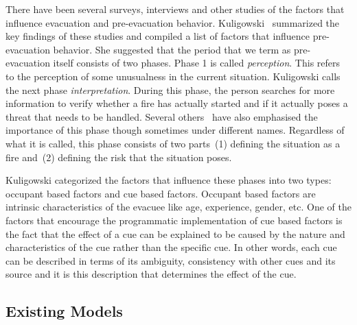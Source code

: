 There have been several surveys, interviews and other studies of the factors that influence evacuation and pre-evacuation behavior. Kuligowski~\cite{Kuligowski:2009un} summarized the key findings of these studies and compiled a list of factors that influence pre-evacuation behavior. She suggested that the period that we term as pre-evacuation itself consists of two phases. Phase 1 is called \emph{perception}. This refers to the perception of some unusualness in the current situation. Kuligowski calls the next phase \emph{interpretation}. During this phase, the person searches for more information to verify whether a fire has actually started and if it actually poses a threat that needs to be handled. Several others~\cite{Ozel:2001tn,Proulx:2007ul,Tong:1985wn} have also emphasised the importance of this phase though sometimes under different names. Regardless of what it is called, this phase consists of two parts~(1) defining the situation as a fire and~(2) defining the risk that the situation poses.


Kuligowski categorized the factors that influence these phases into two types: occupant based factors and cue based factors. Occupant based factors are intrinsic characteristics of the evacuee like age, experience, gender, etc. One of the factors that encourage the programmatic implementation of cue based factors is the fact that the effect of a cue can be explained to be caused by the nature and characteristics of the cue rather than the specific cue. In other words, each cue can be described in terms of its ambiguity, consistency with other cues and its source and it is this description that determines the effect of the cue.


\subsection{Existing Models}
\label{ExistingModels}

